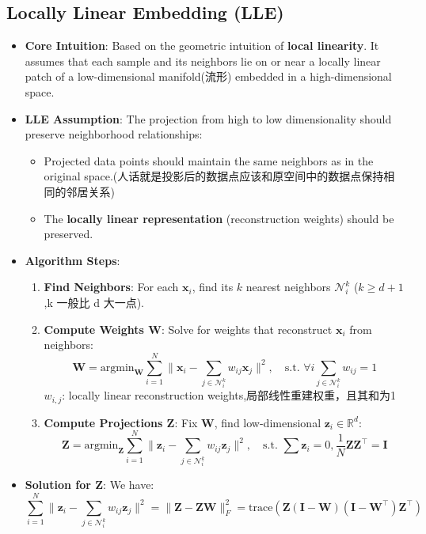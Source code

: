 \documentclass[UTF8]{ctexart}
\begin{document}
\subsection{Locally Linear Embedding (LLE)}
\begin{itemize}
    \item \textbf{Core Intuition}: Based on the geometric intuition of \textbf{local linearity}. It assumes that each sample and its neighbors lie on or near a locally linear patch of a low-dimensional manifold(流形) embedded in a high-dimensional space.
    \item \textbf{LLE Assumption}: The projection from high to low dimensionality should preserve neighborhood relationships:
    \begin{itemize}
        \item Projected data points should maintain the same neighbors as in the original space.(人话就是投影后的数据点应该和原空间中的数据点保持相同的邻居关系)
        \item The \textbf{locally linear representation} (reconstruction weights) should be preserved.
    \end{itemize}
    \item \textbf{Algorithm Steps}:
    \begin{enumerate}
        \item \textbf{Find Neighbors}: For each $\mathbf{x}_i$, find its $k$ nearest neighbors $\mathcal{N}_i^k$ ($k \ge d+1$,k 一般比 d 大一点).
        \item \textbf{Compute Weights $\mathbf{W}$}: Solve for weights that reconstruct $\mathbf{x}_i$ from neighbors:
        $$\mathbf{W} = \text{argmin}_{\mathbf{W}} \sum_{i=1}^N \|\mathbf{x}_i - \sum_{j \in \mathcal{N}_i^k} w_{ij} \mathbf{x}_j\|^2, \quad \text{s.t. } \forall i \sum_{j \in \mathcal{N}_i^k} w_{ij} = 1$$
        $w_{i,j}$: locally linear reconstruction weights,局部线性重建权重，且其和为1
        \item \textbf{Compute Projections $\mathbf{Z}$}: Fix $\mathbf{W}$, find low-dimensional $\mathbf{z}_i \in \mathbb{R}^d$:
        $$\mathbf{Z} = \text{argmin}_{\mathbf{Z}} \sum_{i=1}^N \|\mathbf{z}_i - \sum_{j \in \mathcal{N}_i^k} w_{ij} \mathbf{z}_j\|^2, \quad \text{s.t. } \sum \mathbf{z}_i = 0, \frac{1}{N} \mathbf{Z}\mathbf{Z}^\top = \mathbf{I}$$
    \end{enumerate}
    \item \textbf{Solution for $\mathbf{Z}$}: We have:
    $$\sum_{i=1}^{N} \|\mathbf{z}_i - \sum_{j \in \mathcal{N}_i^k} w_{ij}\mathbf{z}_j\|^2 = \|\mathbf{Z} - \mathbf{Z}\mathbf{W}\|_F^2 = \text{trace} \left( \mathbf{Z}(\mathbf{I} - \mathbf{W})(\mathbf{I} - \mathbf{W}^\top)\mathbf{Z}^\top \right)$$

\end{itemize}
\end{document}

